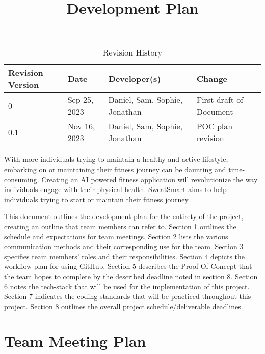 \documentclass{article}
\title{Development Plan\\\progname}
\author{\authname}  %
\date{}
\begin{document}
	\maketitle
	\begin{table}[hp]
		\centering
		\caption{Revision History} \label{TblRevisionHistory}
		\begin{tabularx}{\textwidth}{lllX}
			\toprule
			\textbf{Revision Version} & \textbf{Date} & \textbf{Developer(s)} & \textbf{Change}\\
			\midrule
			0 & Sep 25, 2023 & Daniel, Sam, Sophie, Jonathan & First draft of Document\\
            0.1 & Nov 16, 2023 & Daniel, Sam, Sophie, Jonathan & POC plan revision\\
			\bottomrule
		\end{tabularx}
	\end{table}
	\vspace{0.5cm}
	\maketitle

	With more individuals trying to maintain a healthy and active lifestyle, embarking on or maintaining their fitness journey can be daunting and time-consuming. Creating an AI powered fitness application will revolutionize the way individuals engage with their physical health. SweatSmart aims to help individuals trying to start or maintain their fitness journey.

	This document outlines the development plan for the entirety of the project, creating an outline that team members can refer to. Section 1 outlines the schedule and expectations for team meetings. Section 2 lists the various communication methods and their corresponding use for the team. Section 3 specifies team members’ roles and their responsibilities. Section 4 depicts the workflow plan for using GitHub. Section 5 describes the Proof Of Concept that the team hopes to complete by the described deadline noted in section 8. Section 6 notes the tech-stack that will be used for the implementation of this project. Section 7 indicates the coding standards that will be practiced throughout this project. Section 8 outlines the overall project schedule/deliverable deadlines.


	\section{Team Meeting Plan}
\end{document}
